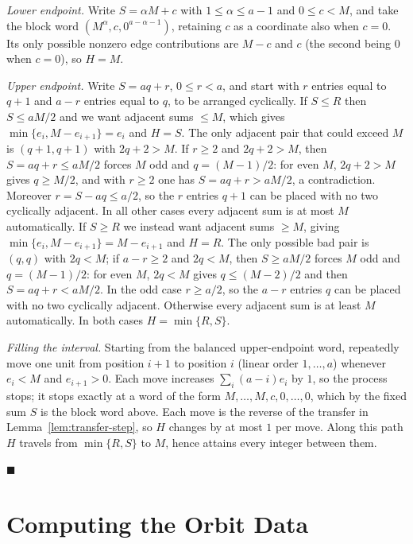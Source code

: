 \emph{Lower endpoint.}  Write $S=\alpha M+c$ with $1\leq\alpha\leq a-1$ and
$0\leq c<M$, and take the block word
$(M^\alpha,c,0^{a-\alpha-1})$, retaining $c$ as a coordinate also when
$c=0$.  Its only possible nonzero edge contributions are $M-c$ and $c$ (the
second being $0$ when $c=0$), so $H=M$.

\emph{Upper endpoint.}  Write $S=aq+r$, $0\leq r<a$, and start with $r$ entries
equal to $q+1$ and $a-r$ entries equal to $q$, to be arranged cyclically.  If
$S\leq R$ then $S\leq aM/2$ and we want adjacent sums $\leq M$, which gives
$\min\{e_i,M-e_{i+1}\}=e_i$ and $H=S$.  The only adjacent pair that could exceed
$M$ is $(q+1,q+1)$ with $2q+2>M$.  If $r\geq2$ and $2q+2>M$, then
$S=aq+r\leq aM/2$ forces $M$ odd and $q=(M-1)/2$: for even $M$,
$2q+2>M$ gives $q\geq M/2$, and with $r\geq2$ one has $S=aq+r>aM/2$, a
contradiction.  Moreover $r=S-aq\leq a/2$, so the $r$ entries $q+1$ can be
placed with no two cyclically adjacent.  In all other cases every adjacent sum
is at most $M$ automatically.  If $S\geq R$ we instead want adjacent sums
$\geq M$, giving $\min\{e_i,M-e_{i+1}\}=M-e_{i+1}$ and $H=R$.  The only
possible bad pair is $(q,q)$ with $2q<M$; if $a-r\geq2$ and $2q<M$, then
$S\geq aM/2$ forces $M$ odd and $q=(M-1)/2$: for even $M$, $2q<M$ gives
$q\leq(M-2)/2$ and then $S=aq+r<aM/2$.  In the odd case $r\geq a/2$, so the
$a-r$ entries $q$ can be placed with no two cyclically adjacent.  Otherwise
every adjacent sum is at least $M$ automatically.  In both
cases $H=\min\{R,S\}$.

\emph{Filling the interval.}  Starting from the balanced upper-endpoint word,
repeatedly move one unit from position $i+1$ to position $i$ (linear order
$1,\ldots,a$) whenever $e_i<M$ and $e_{i+1}>0$.  Each move increases
$\sum_i(a-i)e_i$ by $1$, so the process stops; it stops exactly at a word of
the form $M,\ldots,M,c,0,\ldots,0$, which by the fixed sum $S$ is the block
word above.  Each move is the reverse of the transfer in
Lemma~\ref{lem:transfer-step}, so $H$ changes by at most $1$ per move.  Along
this path $H$ travels from $\min\{R,S\}$ to $M$, hence attains every integer
between them.

\hfill$\blacksquare$

\section{Computing the Orbit Data}\label{sec:orbit-data}

